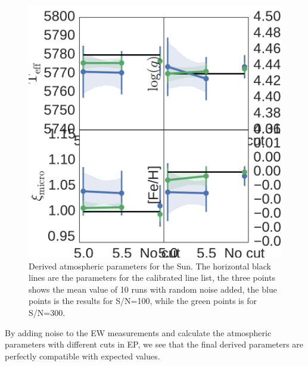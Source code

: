 \documentclass{aa}
\begin{document}
\begin{figure}[t!]
    \centering
    \includegraphics[width=1.0\linewidth]{figures/solar_parameters_10runs.pdf}
    \caption{Derived atmospheric parameters for the Sun. The horizontal
    black lines are the parameters for the calibrated line list, the
    three points shows the mean value of 10 runs with random noise
    added, the blue points is the results for S/N=100, while the
    green points is for S/N=300.}
    \label{fig:solar_parameters}
\end{figure}

By adding noise to the EW measurements and calculate the atmospheric
parameters with different cuts in EP, we see that the final derived parameters
are perfectly compatible with expected values.
\end{document}
